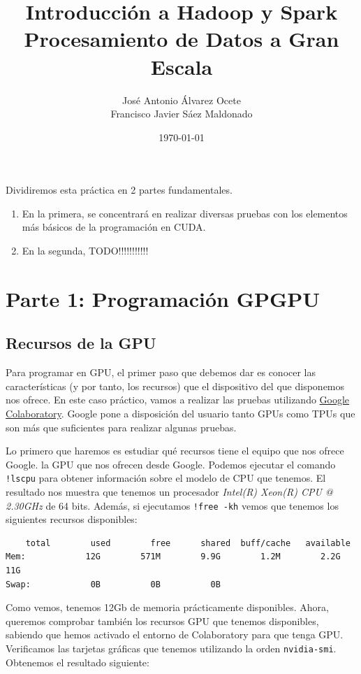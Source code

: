 \documentclass[11pt]{article}
\author{José Antonio Álvarez Ocete\\ Francisco Javier Sáez Maldonado}
\date{\today}
\title{Introducción a Hadoop y Spark\\ Procesamiento de Datos a Gran Escala}
\def\inline{\lstinline[basicstyle=\ttfamily,keywordstyle={}]}
\begin{document}
\maketitle

\tableofcontents

Dividiremos esta práctica en 2 partes fundamentales. 

\begin{enumerate}
	
	\item En la primera, se concentrará en realizar diversas pruebas con los elementos más básicos de la programación en CUDA.
	\item En la segunda, TODO!!!!!!!!!!!
\end{enumerate}

\section{Parte 1: Programación GPGPU}

\subsection{Recursos de la GPU}

Para programar en GPU, el primer paso que debemos dar es conocer las características (y por tanto, los recursos) que el dispositivo del que disponemos nos ofrece. En este caso práctico, vamos a realizar las pruebas utilizando \href{https://colab.research.google.com/}{Google Colaboratory}. Google pone a disposición del usuario tanto GPUs como TPUs que son más que suficientes para realizar algunas pruebas. 

Lo primero que haremos es estudiar qué recursos tiene el equipo que nos ofrece Google. la GPU que nos ofrecen desde Google. Podemos ejecutar el comando \inline{!lscpu} para obtener información sobre el modelo de CPU que tenemos. El resultado nos muestra que tenemos un procesador \emph{Intel(R) Xeon(R) CPU @ 2.30GHz} de 64 bits. Además, si ejecutamos \inline{!free -kh} vemos que tenemos los siguientes recursos disponibles:
\begin{verbatim}
	total        used        free      shared  buff/cache   available
Mem:            12G        571M        9.9G        1.2M        2.2G         11G
Swap:            0B          0B          0B
\end{verbatim}

Como vemos, tenemos 12Gb de memoria prácticamente disponibles. Ahora, queremos comprobar también los recursos GPU que tenemos disponibles, sabiendo que hemos activado el entorno de Colaboratory para que tenga GPU. Verificamos las tarjetas gráficas que tenemos utilizando la orden \inline{nvidia-smi}. Obtenemos el resultado siguiente:\\
\end{document}
